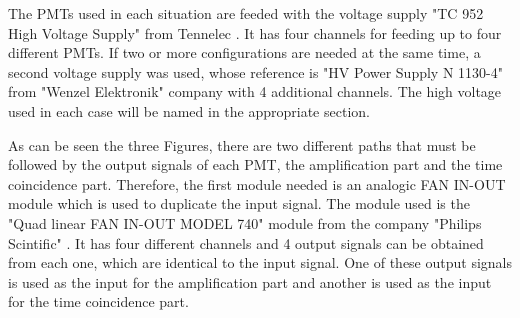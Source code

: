 The PMTs used in each situation are feeded with the voltage supply "TC 952 High Voltage Supply" from Tennelec \cite{DataSheetHVSupplyTennelec}. It has four channels for feeding up to four different PMTs. If two or more configurations are needed at the same time, a second voltage supply was used, whose reference is "HV Power Supply N 1130-4" from "Wenzel Elektronik" company \cite{DataSheetHVSupplyWenzel} with 4 additional channels. The high voltage used in each case will be named in the appropriate section.

As can be seen the three Figures, there are two different paths that must be followed by the output signals of each PMT, the amplification part and the time coincidence part. Therefore, the first module needed is an analogic FAN IN-OUT module which is used to duplicate the input signal. The module used is the "Quad linear FAN IN-OUT MODEL 740" module from the company "Philips Scintific" \cite{DataSheetFANINOUT}. It has four different channels and 4 output signals can be obtained from each one, which are identical to the input signal. One of these output signals is used as the input for the amplification part and another is used as the input for the time coincidence part.

